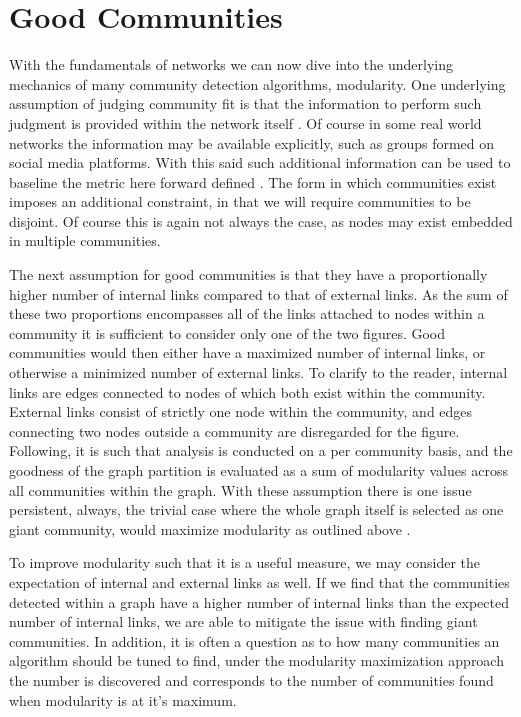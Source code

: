 \documentclass[a4paper, 12pt, twocolumn]{article}
\begin{document}
\section{Good Communities}

With the fundamentals of networks we can now dive into the underlying mechanics of many community detection algorithms, modularity. 
One underlying assumption of judging community fit is that the information to perform such judgment is provided within the network itself \cite{network_science}. 
Of course in some real world networks the information may be available explicitly, such as groups formed on social media platforms. 
With this said such additional information can be used to baseline the metric here forward defined \cite{finding_and_evaling_comm_struct}.
The form in which communities exist imposes an additional constraint, in that we will require communities to be disjoint. 
Of course this is again not always the case, as nodes may exist embedded in multiple communities. 

The next assumption for good communities is that they have a proportionally higher number of internal links compared to that of external links. 
As the sum of these two proportions encompasses all of the links attached to nodes within a community it is sufficient to consider only one of the two figures. 
Good communities would then either have a maximized number of internal links, or otherwise a minimized number of external links. 
To clarify to the reader, internal links are edges connected to nodes of which both exist within the community. 
External links consist of strictly one node within the community, and edges connecting two nodes outside a community are disregarded for the figure. 
Following, it is such that analysis is conducted on a per community basis, and the goodness of the graph partition is evaluated as a sum of modularity values across all communities within the graph. 
With these assumption there is one issue persistent, always, the trivial case where the whole graph itself is selected as one giant community, would maximize modularity as outlined above \cite{finding_comm_struct}. 

To improve modularity such that it is a useful measure, we may consider the expectation of internal and external links as well. 
If we find that the communities detected within a graph have a higher number of internal links than the expected number of internal links, we are able to mitigate the issue with finding giant communities. 
In addition, it is often a question as to how many communities an algorithm should be tuned to find, under the modularity maximization approach the number is discovered and corresponds to the number of communities found when modularity is at it's maximum. 
\end{document}
